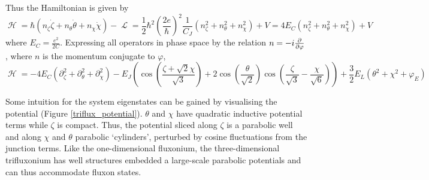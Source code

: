 \documentclass[11pt]{article}
\DeclareMathOperator{\lagr}{\mathcal{L}}
\DeclareMathOperator{\ham}{\mathcal{H}}
\begin{document}
Thus the Hamiltonian is given by
\begin{equation}
\ham 
= \hbar \left(n_\zeta \dot{\zeta} + n_\theta \dot{\theta} + n_\chi \dot{\chi} \right) - \lagr 
= \frac{1}{2} \hbar^2 \left(\frac{2e}{\hbar}\right)^2 \frac{1}{C_J} (n_\zeta^2 + n_\theta^2 + n_\chi^2) + V
= 4 E_C (n_\zeta^2 + n_\theta^2 + n_\chi^2) + V
\end{equation}
where $E_C = \frac{e^2}{2C}$. Expressing all operators in phase space by the relation $n = -i\pdv{}{\varphi}$, where $n$ is the momentum conjugate to $\varphi$,
\begin{equation}
\ham = -4 E_C \left( \partial_\zeta^2 + \partial_\theta^2 + \partial_\chi^2 \right) - E_J \left( \cos{\left(\frac{\zeta + \sqrt{2} \chi}{\sqrt{3}}\right)} + 2 \cos{\left(\frac{\theta}{\sqrt{2}}\right)} \cos{\left(\frac{\zeta}{\sqrt{3}} - \frac{\chi}{\sqrt{6}}\right)} \right) + \frac{3}{2} E_L (\theta^2 + \chi^2 + \varphi_E)
\end{equation}

Some intuition for the system eigenstates can be gained by visualising the potential (Figure \ref{triflux_potential}). $\theta$ and $\chi$ have quadratic inductive potential terms while $\zeta$ is compact. Thus, the potential sliced along $\zeta$ is a parabolic well and along $\chi$ and $\theta$ parabolic `cylinders', perturbed by cosine fluctuations from the junction terms. Like the one-dimensional fluxonium, the three-dimensional trifluxonium has well structures embedded a large-scale parabolic potentials and can thus accommodate fluxon states. 
\end{document}
